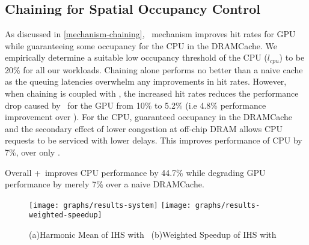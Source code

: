 
\subsection{Chaining for Spatial Occupancy Control}
As discussed in \ref{mechanism-chaining}, \chaining\ mechanism improves hit rates for GPU while guaranteeing some occupancy for the CPU in the DRAMCache. We empirically determine a suitable low occupancy threshold of the CPU (\textit{$l_{cpu}$}) to be 20\% for all our workloads. Chaining alone performs no better than a naive cache as the queuing latencies overwhelm any improvements in hit rates. However, when chaining is coupled with \prioname, the increased hit rates reduces the performance drop caused by \prioname\ for the GPU from 10\% to 5.2\% (i.e 4.8\% performance improvement over \prioname). For the CPU, guaranteed occupancy in the DRAMCache and the secondary effect of lower congestion at off-chip DRAM allows CPU requests to be serviced with lower delays. This improves performance of CPU by 7\%, over only \prioname.
\par Overall \chaining+\prioname\ improves CPU performance by 44.7\% while degrading GPU performance by merely 7\% over a naive DRAMCache.
\begin{figure}[!htb]
    \centering
    \texttt{[image: graphs/results-system]}
    \texttt{[image: graphs/results-weighted-speedup]}
    \caption{(a)Harmonic Mean of IHS with \cachename\ (b)Weighted Speedup of IHS with \cachename}
    \label{results-system}
\end{figure}



